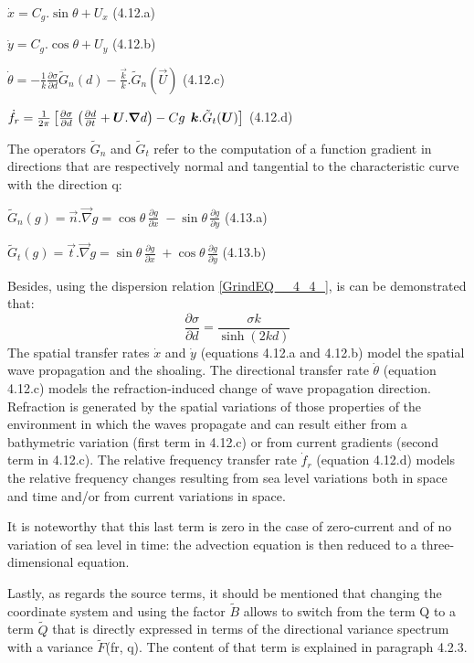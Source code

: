 $\dot{x}=C_{g} .\sin \theta +U_{x} $ (4.12.a)

$\dot{y}=C_{g} .\cos \theta +U_{y} $ (4.12.b)

$\dot{\theta }=-\frac{1}{k} \frac{\partial \sigma }{\partial d} \tilde{G}_{n} (d)-\frac{\vec{k}}{k} .\tilde{G}_{n} (\vec{U})$ (4.12.c)

$\dot{f}_{r} =\frac{1}{2\pi } \left[\frac{\partial \sigma }{\partial d} {\kern 1pt} \left(\frac{\partial d}{\partial t} +\vec{U}.\vec{\nabla }d\right)-Cg\; \, \vec{k}.\tilde{G}_{t} (\vec{U})\right]$ (4.12.d)

 The operators $\tilde{G}_{n} $ and $\tilde{G}_{t} $ refer to the computation of a function gradient in directions that are respectively normal and tangential to the characteristic curve with the direction q:

$\tilde{G}_{n} (g)=\vec{n}.\vec{\nabla }g=\cos \theta \, \frac{\partial g}{\partial x} \; -\sin \theta \, \frac{\partial g}{\partial y} $ (4.13.a)

$\tilde{G}_{t} (g)=\vec{t}.\vec{\nabla }g=\sin \theta \, \frac{\partial g}{\partial x} \; +\cos \theta \, \frac{\partial g}{\partial y} $ (4.13.b)

 Besides, using the dispersion relation \eqref{GrindEQ__4_4_}, is can be demonstrated that:
\begin{equation} \label{GrindEQ__4_14_}
\frac{\partial \sigma }{\partial d} =\frac{\sigma k}{\sinh (2kd)}
\end{equation}
The spatial transfer rates $\dot{x}$ and $\dot{y}$ (equations 4.12.a and 4.12.b) model the spatial wave propagation and the shoaling. The directional transfer rate $\dot{\theta }$ (equation 4.12.c) models the refraction-induced change of wave propagation direction. Refraction is generated by the spatial variations of those properties of the environment in which the waves propagate and can result either from a bathymetric variation (first term in 4.12.c) or from current gradients (second term in 4.12.c). The relative frequency transfer rate $\dot{f}_{r} $ (equation 4.12.d) models the relative frequency changes resulting from sea level variations both in space and time and/or from current variations in space.

 It is noteworthy that this last term is zero in the case of zero-current and of no variation of sea level in time: the advection equation is then reduced to a three-dimensional equation.

 Lastly, as regards the source terms, it should be mentioned that changing the coordinate system and using the factor $\tilde{B}$ allows to switch from the term Q to a term $\tilde{Q}$ that is directly expressed in terms of the directional variance spectrum with a variance $\tilde{F}$(fr, q). The content of that term is explained in paragraph 4.2.3.


